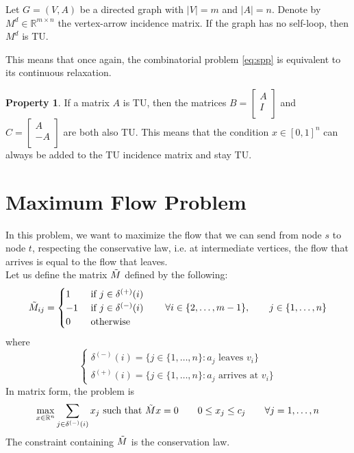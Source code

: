 \documentclass[11pt, openany]{report}
\newcommand{\R}{\mathbb{R}}
\theoremstyle{definition}
\newtheorem{prop}[thm]{Property}
\begin{document}
\begin{tcolorbox}[breakable,
    colback=white,
    colframe=white!75!black,
    title={Theorem}]
    Let \(G=(V,A)\) be a directed graph with \(|V|=m\) and \(|A|=n\). Denote by \(M^d\in\R^{m\times n}\) the vertex-arrow incidence matrix. If the graph has no self-loop, then \(M^d\) is TU.
\end{tcolorbox}
This means that once again, the combinatorial problem \eqref{eq:spp} is equivalent to its continuous relaxation. 
\begin{prop}
    If a matrix \(A\) is TU, then the matrices \(B=\begin{bmatrix}
        A \\
        I \\
    \end{bmatrix}\) and \(C=\begin{bmatrix}
        A\\ -A\\
    \end{bmatrix}\) are both also TU. This means that the condition \(x\in [0,1]^n\) can always be added to the TU incidence matrix and stay TU.
\end{prop}
\section{Maximum Flow Problem}
In this problem, we want to maximize the flow that we can send from node \(s\) to node \(t\), respecting the conservative law, i.e. at intermediate vertices, the flow that arrives is equal to the flow that leaves. \\
Let us define the matrix \(\Tilde M\) defined by the following:
\begin{equation}
    \Tilde M_{ij} = \begin{cases}
        1 & \text{ if } j\in \delta^{(+)}(i)\\
        -1 & \text{ if } j\in \delta^{(-)}(i)\\
        0 & \text{ otherwise}\\
    \end{cases} \qquad \forall i\in \{2,\dots,m-1\},\qquad j\in \{1,\dots, n\}
\end{equation}
where 
\begin{equation}
    \begin{cases}
        \delta^{(-)}(i) = \{j\in \{1,\dots,n\}:a_j\text{ leaves }v_i\}\\
        \delta^{(+)}(i) = \{j\in \{1,\dots,n\}:a_j\text{ arrives at }v_i\}
    \end{cases}
\end{equation}
In matrix form, the problem is
\begin{equation}
    \max_{x\in \R^n} \sum_{j\in \delta^{(-)}(i)}x_j \text{   such that   } \Tilde Mx=0\qquad 0\le x_j\le c_j \qquad \forall j=1,\dots,n
\end{equation}
The constraint containing \(\Tilde M\) is the conservation law. 
\end{document}
